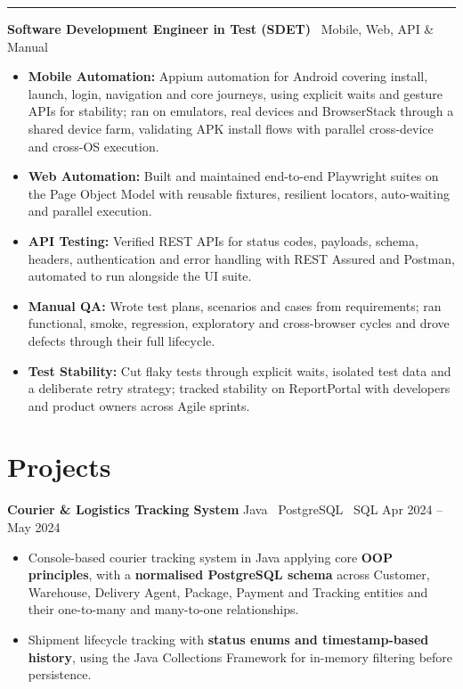 \documentclass[a4paper,10pt]{article}
\newcommand{\role}[2]{%
  \vspace{5pt}%
  \noindent\textcolor{accent}{\rule[-2pt]{2.6pt}{12pt}}\hspace{6pt}%
  {\color{ink}\bfseries #1}%
  {\color{muted} \textemdash\ #2}%
  \par\vspace{1pt}%
}
\newcommand{\lead}[1]{{\color{ink}\bfseries #1}}
\newcommand{\project}[3]{%
  \vspace{3pt}%
  {\color{ink}\bfseries #1}%
  \hfill%
  {\color{muted}\small #2 \quad #3}%
  \par%
}
\begin{document}
\role{Software Development Engineer in Test (SDET)}{Mobile, Web, API \& Manual}
\begin{itemize}
  \item \lead{Mobile Automation:} Appium automation for Android covering install, launch, login,
    navigation and core journeys, using explicit waits and gesture APIs for stability; ran on
    emulators, real devices and BrowserStack through a shared device farm, validating APK install
    flows with parallel cross-device and cross-OS execution.
  \item \lead{Web Automation:} Built and maintained end-to-end Playwright suites on the Page Object
    Model with reusable fixtures, resilient locators, auto-waiting and parallel execution.
  \item \lead{API Testing:} Verified REST APIs for status codes, payloads, schema, headers,
    authentication and error handling with REST Assured and Postman, automated to run alongside
    the UI suite.
  \item \lead{Manual QA:} Wrote test plans, scenarios and cases from requirements; ran functional,
    smoke, regression, exploratory and cross-browser cycles and drove defects through their full
    lifecycle.
  \item \lead{Test Stability:} Cut flaky tests through explicit waits, isolated test data and a
    deliberate retry strategy; tracked stability on ReportPortal with developers and product owners
    across Agile sprints.
\end{itemize}

\section{Projects}

\project{Courier \& Logistics Tracking System}{Java \textperiodcentered\ PostgreSQL \textperiodcentered\ SQL}{Apr 2024 -- May 2024}
\begin{itemize}
  \item Console-based courier tracking system in Java applying core \lead{OOP principles}, with a
    \lead{normalised PostgreSQL schema} across Customer, Warehouse, Delivery Agent, Package,
    Payment and Tracking entities and their one-to-many and many-to-one relationships.
  \item Shipment lifecycle tracking with \lead{status enums and timestamp-based history}, using the
    Java Collections Framework for in-memory filtering before persistence.
\end{itemize}
\end{document}
